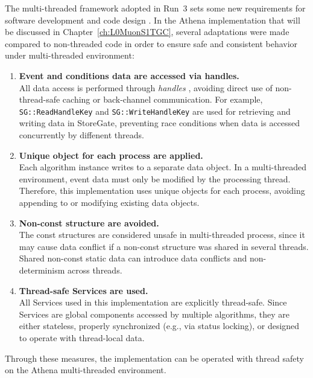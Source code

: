 The multi-threaded framework adopted in Run~3 sets some new requirements for software development and code design \cite{ATLAScomputing2025}. In the Athena implementation that will be discussed in Chapter~\ref{ch:L0MuonS1TGC}, several adaptations were made compared to non-threaded code in order to ensure safe and consistent behavior under multi-threaded environment:

\begin{enumerate}
  \item \textbf{Event and conditions data are accessed via handles.} \\
  All data access is performed through \textit{handles} , avoiding direct use of non-thread-safe caching or back-channel communication. For example, \texttt{SG::ReadHandleKey} and \texttt{SG::WriteHandleKey} are used for retrieving and writing data in StoreGate, preventing race conditions when data is accessed concurrently by diffenent threads.
  
  \item \textbf{Unique object for each process are applied.} \\
  Each algorithm instance writes to a separate data object. In a multi-threaded environment, event data must only be modified by the processing thread. Therefore, this implementation uses unique objects for each process, avoiding appending to or modifying existing data objects.
  
  \item \textbf{Non-const structure are avoided.} \\
  The const structures are considered unsafe in multi-threaded process, since it may cause data conflict if a non-const structure was shared in several threads. Shared non-const static data can introduce data conflicts and non-determinism across threads.
  
  \item \textbf{Thread-safe Services are used.} \\
  All Services used in this implementation are explicitly thread-safe. Since Services are global components accessed by multiple algorithms, they are either stateless, properly synchronized (e.g., via status locking), or designed to operate with thread-local data.
\end{enumerate}

Through these measures, the implementation can be operated with thread safety on the Athena multi-threaded environment.